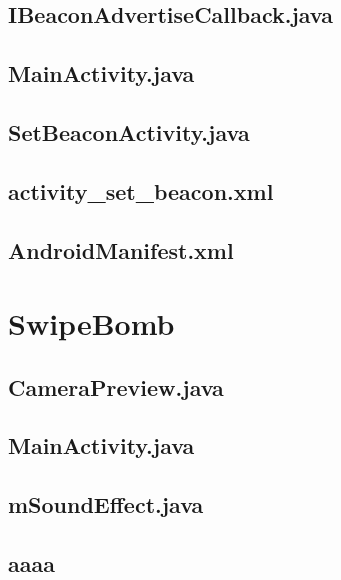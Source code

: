 \documentclass[11pt,a4j]{jarticle}
\begin{document}
\subsection{IBeaconAdvertiseCallback.java}
	
	\newpage
\subsection{MainActivity.java}
	
	\newpage
\subsection{SetBeaconActivity.java}
	
	\newpage



\subsection{activity\_set\_beacon.xml}
	
	\newpage
\subsection{AndroidManifest.xml}
	
	\newpage


\section{SwipeBomb}
\subsection{CameraPreview.java}
	
	\newpage
\subsection{MainActivity.java}
	
	\newpage
\subsection{mSoundEffect.java}
	
	\newpage
\subsection{aaaa}
\end{document}
